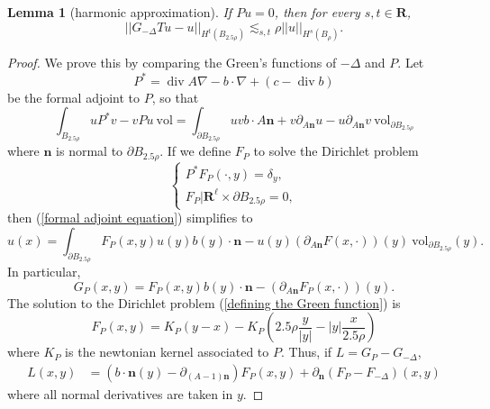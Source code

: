 \documentclass[reqno,12pt,letterpaper]{amsart}
\newcommand{\RR}{\mathbf{R}}
\DeclareMathOperator{\Div}{div}
\newcommand{\normal}{\mathbf n}
\newcommand{\vol}{\mathrm{vol}}
\newtheorem{lemma}[theorem]{Lemma}
\theoremstyle{definition}
\numberwithin{equation}{section}
\begin{document}
\begin{lemma}[harmonic approximation]\label{approx harmonic}
If $Pu = 0$, then for every $s, t \in \RR$,
$$||G_{-\Delta}Tu - u||_{H^t(B_{2.5\rho})} \lesssim_{s, t} \rho ||u||_{H^s(B_\rho)}.$$
\end{lemma}
\begin{proof}
We prove this by comparing the Green's functions of $-\Delta$ and $P$. Let
$$P^* = \Div A \nabla - b \cdot \nabla + (c - \Div b)$$
be the formal adjoint to $P$, so that
\begin{equation}\label{formal adjoint equation}
\int_{B_{2.5\rho}} uP^*v - vPu ~\vol = \int_{\partial B_{2.5\rho}} uv b \cdot A\normal + v\partial_{A\normal} u - u\partial_{A\normal} v ~\vol_{\partial B_{2.5\rho}}
\end{equation}
where $\normal$ is normal to $\partial B_{2.5\rho}$.
If we define $F_P$ to solve the Dirichlet problem
\begin{equation}\label{defining the Green function}
\begin{cases}P^* F_P(\cdot, y) = \delta_y,\\
F_P|\RR^\ell \times \partial B_{2.5\rho} = 0,
\end{cases}
\end{equation}
then (\ref{formal adjoint equation}) simplifies to
$$u(x) = \int_{\partial B_{2.5\rho}} F_P(x, y)u(y) b(y) \cdot \normal - u(y) (\partial_{A \normal} F(x, \cdot))(y) ~\vol_{\partial B_{2.5\rho}}(y).$$
In particular,
$$G_P(x, y) = F_P(x, y)b(y) \cdot \normal - (\partial_{A \normal} F_P(x, \cdot))(y).$$
The solution to the Dirichlet problem (\ref{defining the Green function}) is
$$F_P(x, y) = K_P(y - x) - K_P\left(2.5\rho \frac{y}{|y|} - |y| \frac{x}{2.5\rho}\right)$$
where $K_P$ is the newtonian kernel associated to $P$.
Thus, if $L = G_P - G_{-\Delta}$,
\begin{align*}
L(x, y) &= (b \cdot \normal(y) - \partial_{(A - 1)\normal})F_P(x, y) + \partial_\normal (F_P - F_{-\Delta})(x, y)
\end{align*}
where all normal derivatives are taken in $y$.


\end{proof}
\end{document}
